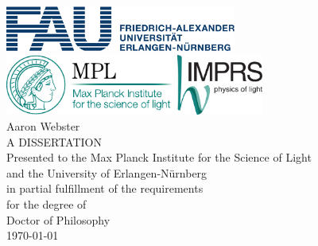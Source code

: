 \begin{titlepage}
\begin{center}
\hfill\\[4cm]
{ \Huge {\bfseries {\distitle}} \par}
\vspace{3.0cm}
\includegraphics[height=1.5cm,keepaspectratio]{images/FAU_cmyk}\\
\vspace{1cm}
\includegraphics[height=2cm,keepaspectratio]{images/Logo_MPL_englisch_kompakt_cmyk_110915}
\hspace{1cm}
\includegraphics[height=2cm,keepaspectratio]{images/Logo_IMPRS_4c_042012}
\vspace{3cm}
\\
{\LARGE Aaron Webster}\\
\vspace{1cm}
{\large A DISSERTATION}\\
\vspace{0.5cm}
Presented to the Max Planck Institute for the Science of Light\\
and the University of Erlangen-N\"urnberg\\
in partial fulfillment of the requirements\\
for the degree of\\
Doctor of Philosophy\\
\vspace{0.5cm}
\today
\end{center}
\end{titlepage}
